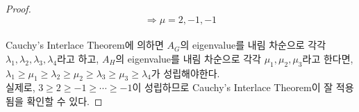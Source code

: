 \documentclass[a4paper, 12pt]{article}
\begin{document}
\begin{proof}
$$\Rightarrow \mu = 2, -1, -1$$\\
Cauchy's Interlace Theorem에 의하면 $A_G$의 eigenvalue를 내림 차순으로 각각 $\lambda_1, \lambda_2, \lambda_3,\lambda_4$라고 하고, $A_H$의 eigenvalue를 내림 차순으로 각각 $\mu_1, \mu_2, \mu_3$라고 한다면, $\lambda_1 \geq \mu_1 \geq \lambda_2 \geq \mu_2 \geq \lambda_3 \geq \mu_3 \geq \lambda_4$가 성립해야한다.\\
실제로, $3 \geq 2 \geq -1 \geq \cdots \geq -1$이 성립하므로 Cauchy's Interlace Theorem이 잘 적용됨을 확인할 수 있다.

\end{proof}
\end{document}
